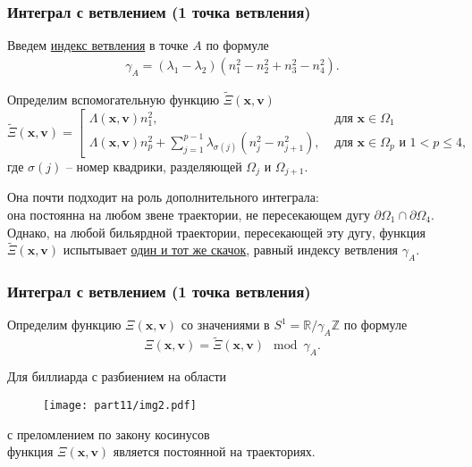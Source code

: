 \begin{frame}\frametitle{Интеграл с ветвлением (1 точка ветвления)}
\qq Введем \underline{индекс ветвления} в точке $A$ по формуле \begin{align*}
\gamma_A = (\lambda_1 - \lambda_2) ( n_1^2 - n_2^2 + n_3^2 - n_4^2).
\end{align*}



\qq Определим вспомогательную функцию $\widetilde{\Xi}(\mathbf{x}, \mathbf{v})$ 
\begin{equation*}
\widetilde{\Xi}(\mathbf{x}, \mathbf{v}) = \left[
\begin{array}{ll}
    \Lambda(\mathbf{x}, \mathbf{v}) n_1^2, &  \text{ для } \mathbf{x} \in \Omega_1 
    \\
    \Lambda(\mathbf{x}, \mathbf{v}) n_p^2 + 
    \sum_{j=1}^{p-1} \lambda_{\sigma(j)}(n_j^2-n_{j+1}^2), \!\!\!& \text{ для } \mathbf{x} \in \Omega_p \text{ и } 1 < p \leq 4,
\end{array}
\right.
\end{equation*}
где $\sigma(j)$ -- номер квадрики, разделяющей $\Omega_j$ и $\Omega_{j+1}$.

\qq Она почти подходит на роль дополнительного интеграла: \\
она постоянна на любом звене траектории, не пересекающем дугу $\partial \Omega_1  \cap \partial  \Omega_4$. \\Однако, на любой бильярдной траектории, пересекающей эту дугу, функция $\widetilde{\Xi}(\mathbf{x}, \mathbf{v})$ испытывает \underline{один и тот же скачок}, равный индексу ветвления $\gamma_A$. 
\end{frame}

\begin{frame}\frametitle{Интеграл с ветвлением (1 точка ветвления)}
\qq Определим функцию $\Xi(\mathbf{x}, \mathbf{v})$ со значениями в $S^1= \mathbb{R}/\gamma_A \mathbb{Z}$ по формуле $$\Xi(\mathbf{x}, \mathbf{v}) = \widetilde{\Xi}(\mathbf{x}, \mathbf{v}) \mod \gamma_A.$$

\begin{mytheorem}
Для биллиарда с  разбиением на области  

\begin{figure}[!htb]
\centering
\texttt{[image: part11/img2.pdf]}
\end{figure}
с преломлением по закону косинусов\\
функция $\Xi(\mathbf{x}, \mathbf{v})$ является постоянной на траекториях.
\end{mytheorem}
\end{frame}

